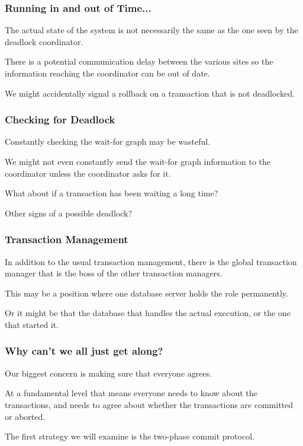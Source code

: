 \begin{frame}
\frametitle{Running in and out of Time...}

The actual state of the system is not necessarily the same as the one seen by the deadlock coordinator. 

There is a potential communication delay between the various sites so the information reaching the coordinator can be out of date.

We might accidentally signal a rollback on a transaction that is not deadlocked.


\end{frame}

\begin{frame}
\frametitle{Checking for Deadlock}

Constantly checking the wait-for graph may be wasteful.

We might not even constantly send the wait-for graph information to the coordinator unless the coordinator asks for it.

What about if a transaction has been waiting a long time?

Other signs of a possible deadlock?

\end{frame}

\begin{frame}
\frametitle{Transaction Management}

In addition to the usual transaction management, there is the global transaction manager that is the boss of the other transaction managers. 

This may be a position where one database server holds the role permanently.

Or it might be that the database that handles the actual execution, or the one that started it.

\end{frame}

\begin{frame}
\frametitle{Why can't we all just get along?}

Our biggest concern is making sure that everyone agrees. 

At a fundamental level that means everyone needs to know about the transactions, and needs to agree about whether the transactions are committed or aborted. 

The first strategy we will examine is the two-phase commit protocol.

\end{frame}

